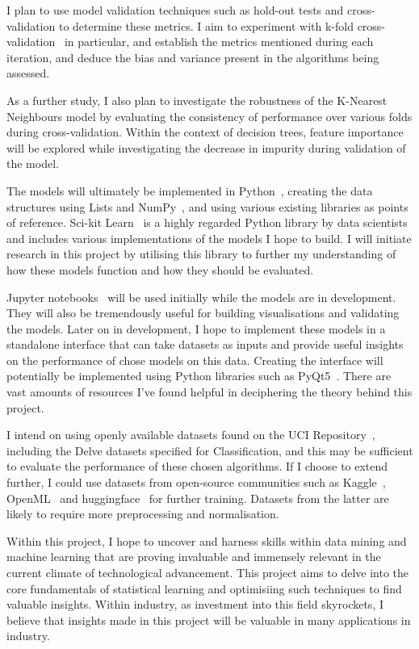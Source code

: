 \documentclass[letterpaper,11pt]{article}
\begin{document}
I plan to use model validation techniques such as hold-out tests and cross-validation to determine these metrics. I aim to experiment with k-fold cross-validation~\cite[p.241-249]{tEoSLHastie} in particular, and establish the metrics mentioned during each iteration, and deduce the bias and variance present in the algorithms being assessed. \par
As a further study, I also plan to investigate the robustness of the K-Nearest Neighbours model by evaluating the consistency of performance over various folds during cross-validation. Within the context of decision trees, feature importance will be explored while investigating the decrease in impurity during validation of the model. \par

The models will ultimately be implemented in Python~\cite{python3}, creating the data structures using Lists and NumPy~\cite{numpy}, and using various existing libraries as points of reference. Sci-kit Learn~\cite{scikit-learn} is a highly regarded Python library by data scientists and includes various implementations of the models I hope to build. I will initiate research in this project by utilising this library to further my understanding of how these models function and how they should be evaluated. \par
Jupyter notebooks~\cite{jupyter} will be used initially while the models are in development. They will also be tremendously useful for building visualisations and validating the models. Later on in development, I hope to implement these models in a standalone interface that can take datasets as inputs and provide useful insights on the performance of chose models on this data. Creating the interface will potentially be implemented using Python libraries such as PyQt5~\cite{pyqt5}. There are vast amounts of resources I've found helpful in deciphering the theory behind this project. \par
I intend on using openly available datasets found on the UCI Repository~\cite{uci}, including the Delve datasets specified for Classification, and this may be sufficient to evaluate the performance of these chosen algorithms. If I choose to extend further, I could use datasets from open-source communities such as Kaggle~\cite{kaggle}, OpenML~\cite{OpenML2013} and huggingface~\cite{huggingface} for further training. Datasets from the latter are likely to require more preprocessing and normalisation.  \par
Within this project, I hope to uncover and harness skills within data mining and machine learning that are proving invaluable and immensely relevant in the current climate of technological advancement. This project aims to delve into the core fundamentals of statistical learning and optimisiing such techniques to find valuable insights. Within industry, as investment into this field skyrockets, I believe that insights made in this project will be valuable in many applications in industry. 
\end{document}
